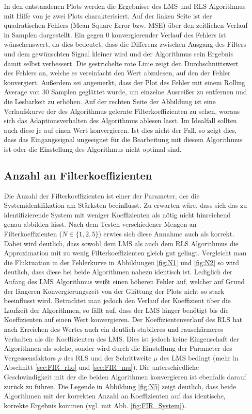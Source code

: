In den entstandenen Plots werden die Ergebnisse des LMS und RLS Algorithmus mit Hilfe von je zwei Plots charakterisiert. 
Auf der linken Seite ist der quadratischen Fehlers (Mean-Square-Error bzw. MSE) über den zeitlichen Verlauf in Samplen dargestellt. 
Ein gegen 0 konvergierender Verlauf des Fehlers ist wünschenswert, da dies bedeutet, dass die Differenz zwischen Ausgang des Filters und dem gewünschten Signal kleiner wird und der Algorithmus sein Ergebnis damit selbst verbessert.
Die gestrichelte rote Linie zeigt den Durchschnittswert des Fehlers an, welche es vereinfacht den Wert abzulesen, auf den der Fehler konvergiert.
Außerdem sei angemerkt, dass der Plot des Fehler mit einem Rolling Average von 30 Samplen geglättet wurde, um einzelne Ausreißer zu entfernen und die Lesbarkeit zu erhöhen.
Auf der rechten Seite der Abbildung ist eine Verlaufskurve der des Algorithmus gelernte Filterkoeffizienten zu sehen, woraus sich das Adaptionsverhalten des Algorithmus ablesen lässt.
Im Idealfall sollten auch diese je auf einen Wert konvergieren.
Ist dies nicht der Fall, so zeigt dies, dass das Eingangssignal ungeeignet für die Bearbeitung mit diesem Algorithmus ist oder die Einstellung des Algorithmus nicht optimal sind.



\subsection{Anzahl an Filterkoeffizienten}

Die Anzahl der Filterkoeffizienten ist einer der Parameter, der die Systemidentifikation am Stärksten beeinflusst. 
Zu erwarten wäre, dass sich das zu identifizierende System mit weniger Koeffizienten als nötig nicht hinreichend genau abbilden lässt. 
Nach dem Testen verschiedener Mengen an Filterkoeffizienten ($N \in \{1, 2, 5\}$) erwies sich diese Annahme auch als korrekt.
Dabei wird deutlich, dass sowohl dem LMS als auch dem RLS Algorithmus die Approximation mit zu wenig Filterkoeffizienten gleich gut gelingt.
Vergleicht man die Fluktuation in der Fehlerkurve in Abbildungen \ref{fig:N1} und \ref{fig:N2} so wird deutlich, dass diese bei beide Algorithmen nahezu identisch ist.
Lediglich der Anfang des LMS Algorithmus weißt einen höheren Fehler auf, welcher auf Grund der längeren Konvergierungszeit von der Glättung der Plots nicht so stark beeinflusst wird.
Betrachtet man jedoch den Verlauf der Koeffizient über die Laufzeit der Algorithmen, so fällt auf, dass der LMS länger benötigt bis die Koeffizienten auf einen Wert konvergieren.
Der Koeffizientenverlauf des RLS hat nach Erreichen des Wertes auch ein deutlich stabileres und rauschärmeres Verhalten als die Koeffizienten des LMS.
Dies ist jedoch keine Eingenschaft der Algorithmen als solche, sonder wird durch die Einstellung der Parameter des Vergessensfaktors $\rho$ des RLS und der Schrittweite $\mu$ des LMS bedingt (mehr in Abschnitt \ref{sec:FIR_rho} und \ref{sec:FIR_mu}).
Die unterschiedliche Geschwindigkeit mit der die beiden Algorithmen konvergieren ist ebenfalls darauf zurück zu führen.
Die Legende in Abbildung \ref{fig:N5} zeigt deutlich, dass beide Algorithmen mit der korrekten Anzahl an Koeffizienten auf das identische, korrekte Ergebnis kommen (vgl. mit Abb. \ref{fig:FIR_System}).

